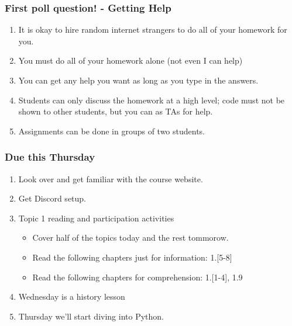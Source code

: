 \documentclass{beamer}
\begin{document}
\begin{frame}
  \frametitle{First poll question! - Getting Help}
  \begin{enumerate}
    \item It is okay to hire random internet strangers to do all of your homework for you.
    \item You must do all of your homework alone (not even I can help)
    \item You can get any help you want as long as you type in the answers.
    \item Students can only discuss the homework at a high level; code must not be shown to other students, but you can as TAs for help.
    \item Assignments can be done in groups of two students.
  \end{enumerate}
\end{frame}

\begin{frame}
  \frametitle{Due this Thursday}
  \begin{enumerate}
    \item Look over and get familiar with the course website. 
    \item Get Discord setup.
    \item Topic 1 reading and participation activities
      \begin{itemize}
        \item Cover half of the topics today and the rest tommorow.
        \item Read the following chapters just for information: 1.[5-8]
        \item Read the following chapters for comprehension: 1.[1-4], 1.9
      \end{itemize}
    \item Wednesday is a history lesson
    \item Thursday we'll start diving into Python.
  \end{enumerate}
\end{frame}
\end{document}

